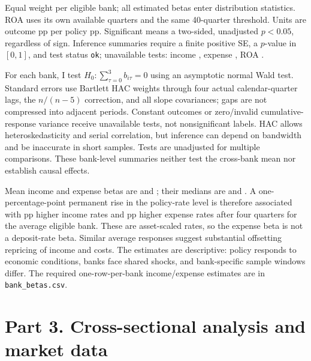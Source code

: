 \documentclass[10pt]{article}
\begin{document}
\begin{table}[H]
\centering
\caption{Distribution and inference for estimated cumulative responses}\label{tab:betas}
\begingroup\small\setlength{\tabcolsep}{4pt}

\endgroup
\begin{minipage}{0.94\textwidth}\footnotesize
Equal weight per eligible bank; all estimated betas enter distribution statistics. ROA uses its own available quarters and the same 40-quarter threshold. Units are outcome pp per policy pp. Significant means a two-sided, unadjusted $p<0.05$, regardless of sign. Inference summaries require a finite positive SE, a $p$-value in $[0,1]$, and test status \texttt{ok}; unavailable tests: income \IncUnavailableTests{}, expense \ExpUnavailableTests{}, ROA \RoaUnavailableTests{}.
\end{minipage}
\end{table}

For each bank, I test $H_0:\sum_{\tau=0}^{3}b_{i\tau}=0$ using an asymptotic normal Wald test. Standard errors use Bartlett HAC weights through four actual calendar-quarter lags, the $n/(n-5)$ correction, and all slope covariances; gaps are not compressed into adjacent periods. Constant outcomes or zero/invalid cumulative-response variance receive unavailable tests, not nonsignificant labels. HAC allows heteroskedasticity and serial correlation, but inference can depend on bandwidth and be inaccurate in short samples. Tests are unadjusted for multiple comparisons. These bank-level summaries neither test the cross-bank mean nor establish causal effects.

Mean income and expense betas are \IncMean{} and \ExpMean{}; their medians are \IncMedian{} and \ExpMedian{}. A one-percentage-point permanent rise in the policy-rate level is therefore associated with \IncMean{} pp higher income rates and \ExpMean{} pp higher expense rates after four quarters for the average eligible bank. These are asset-scaled rates, so the expense beta is not a deposit-rate beta. Similar average responses suggest substantial offsetting repricing of income and costs. The estimates are descriptive: policy responds to economic conditions, banks face shared shocks, and bank-specific sample windows differ. The required one-row-per-bank income/expense estimates are in \texttt{bank\_betas.csv}.

\section*{Part 3. Cross-sectional analysis and market data}
\end{document}
